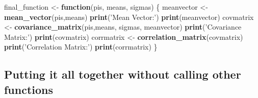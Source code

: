 \documentclass[]{article}
\newenvironment{Shaded}{\begin{snugshade}}{\end{snugshade}}
\newcommand{\ControlFlowTok}[1]{\textcolor[rgb]{0.13,0.29,0.53}{\textbf{#1}}}
\newcommand{\KeywordTok}[1]{\textcolor[rgb]{0.13,0.29,0.53}{\textbf{#1}}}
\newcommand{\NormalTok}[1]{#1}
\newcommand{\StringTok}[1]{\textcolor[rgb]{0.31,0.60,0.02}{#1}}
\begin{document}
\begin{Shaded}
\begin{Highlighting}[]
\NormalTok{final_function <-}\StringTok{ }\ControlFlowTok{function}\NormalTok{(pis, means, sigmas) \{}
\NormalTok{    meanvector <-}\StringTok{ }\KeywordTok{mean_vector}\NormalTok{(pis,means)}
    \KeywordTok{print}\NormalTok{(}\StringTok{'Mean Vector:'}\NormalTok{)}
    \KeywordTok{print}\NormalTok{(meanvector)}
\NormalTok{    covmatrix <-}\StringTok{ }\KeywordTok{covariance_matrix}\NormalTok{(pis,means, sigmas, meanvector)}
    \KeywordTok{print}\NormalTok{(}\StringTok{'Covariance Matrix:'}\NormalTok{)}
    \KeywordTok{print}\NormalTok{(covmatrix)}
\NormalTok{    corrmatrix <-}\StringTok{ }\KeywordTok{correlation_matrix}\NormalTok{(covmatrix)}
    \KeywordTok{print}\NormalTok{(}\StringTok{'Correlation Matrix:'}\NormalTok{)}
    \KeywordTok{print}\NormalTok{(corrmatrix)}
\NormalTok{\}}
\end{Highlighting}
\end{Shaded}

\newpage

\hypertarget{putting-it-all-together-without-calling-other-functions}{%
\subsection{Putting it all together without calling other
functions}\label{putting-it-all-together-without-calling-other-functions}}
\end{document}
